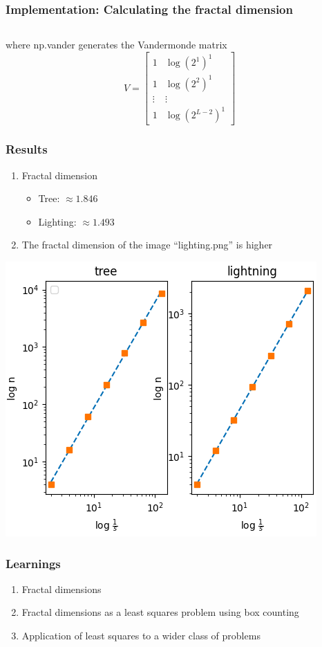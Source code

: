 \documentclass[10pt,aspectratio=169,handout]{beamer}
\begin{document}
\begin{frame}
    \frametitle{Implementation: Calculating the fractal dimension}
    \inputminted[bgcolor=LightGray,fontsize=\small]{python}{get_slope.py}
    where np.vander generates the Vandermonde matrix
    \[V=\begin{bmatrix}
        1 & \log(2^1)^1\\
        1 & \log(2^2)^1\\
        \vdots & \vdots \\
        1 & \log(2^{L-2})^1
    \end{bmatrix}\]
\end{frame}

\begin{frame}
    \frametitle{Results}

    \begin{minipage}{0.45\textwidth}
        \begin{enumerate}
            \item Fractal dimension\begin{itemize}
                \item Tree: $\approx 1.846$
                \item Lighting: $\approx1.493$
            \end{itemize}
            \item The fractal dimension of the image ``lighting.png'' is higher
        \end{enumerate}
    \end{minipage}
    \begin{minipage}{0.45\textwidth}
        \includegraphics[scale=0.4]{images/plots.png}
    \end{minipage}
\end{frame}

\begin{frame}
    \frametitle{Learnings}
    \begin{enumerate}
        \item Fractal dimensions
        \item Fractal dimensions as a least squares problem using box counting
        \item Application of least squares to a wider class of problems
    \end{enumerate}
\end{frame}
\end{document}
